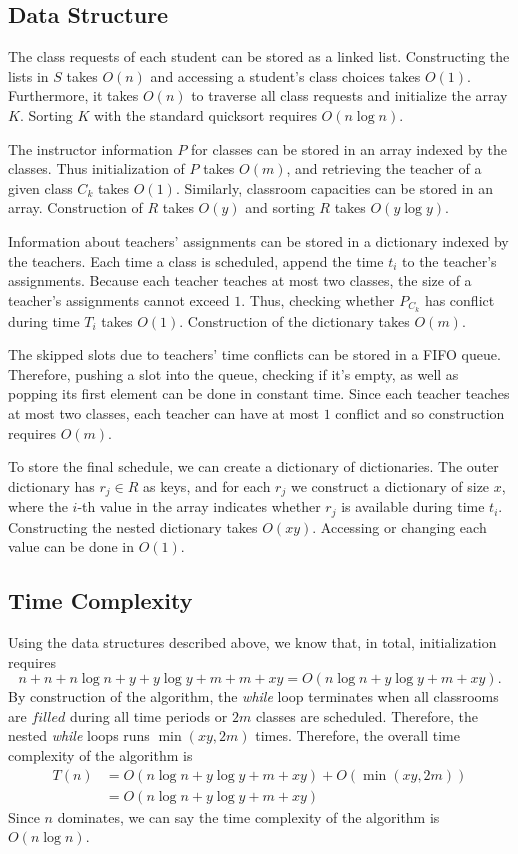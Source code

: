 \documentclass[11pt, oneside]{article}   	%
\begin{document}
\subsection{Data Structure}
The class requests of each student can be stored as a linked list. Constructing the lists in $S$ takes $O(n)$ and accessing a student's class choices takes $O(1)$. Furthermore, it takes $O(n)$ to traverse all class requests and initialize the array $K$. Sorting $K$ with the standard quicksort requires $O(n\log n)$.\par
The instructor information $P$ for classes can be stored in an array indexed by the classes. Thus initialization of $P$ takes $O(m)$, and retrieving the teacher of a given class $C_k$ takes $O(1)$. Similarly, classroom capacities can be stored in an array. Construction of $R$ takes $O(y)$ and sorting $R$ takes $O(y\log y)$.\par
Information about teachers' assignments can be stored in a dictionary indexed by the teachers. Each time a class is scheduled, append the time $t_i$ to the teacher's assignments. Because each teacher teaches at most two classes, the size of a teacher's assignments cannot exceed $1$. Thus, checking whether $P_{C_k}$ has conflict during time $T_i$ takes $O(1)$. Construction of the dictionary takes $O(m)$.\par
The skipped slots due to teachers' time conflicts can be stored in a FIFO queue. Therefore, pushing a slot into the queue, checking if it's empty, as well as popping its first element can be done in constant time. Since each teacher teaches at most two classes, each teacher can have at most $1$ conflict and so construction requires $O(m)$.\par
To store the final schedule, we can create a dictionary of dictionaries. The outer dictionary has $r_j\in R$ as keys, and for each $r_j$ we construct a dictionary of size $x$, where the $i$-th value in the array indicates whether $r_j$ is available during time $t_i$. Constructing the nested dictionary takes $O(xy)$. Accessing or changing each value can be done in $O(1)$.\par


\subsection{Time Complexity}
Using the data structures described above, we know that, in total, initialization requires \[n+n+n\log n+y+y\log y+m+m+xy = O(n\log n+y\log y+m +xy).\] By construction of the algorithm, the {\it while} loop terminates when all classrooms are $filled$ during all time periods or $2m$ classes are scheduled. Therefore, the nested {\it while} loops runs $\min(xy, 2m)$ times. Therefore, the overall time complexity of the algorithm is 
\begin{align*}
T(n) &= O(n\log n+y\log y+m +xy)+O(\min(xy, 2m))\\
& = O(n\log n+y\log y+m +xy)
\end{align*}
Since $n$ dominates, we can say the time complexity of the algorithm is $O(n\log n)$.
\end{document}
